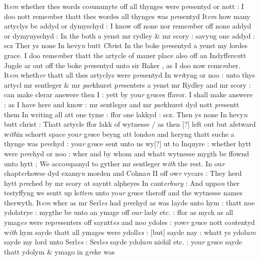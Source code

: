 \documentclass[12pt, a4paper]{book}
\begin{document}
It\textit{em} whether thes words co\textit{m}munyte off all thynges were p\textit{re}sentyd or nott : I doo nott reme\textit{m}ber thatt thes wordes all thynges was p\textit{re}sentyd It\textit{em} how many artyclys be addyd or dymyschyd : I know off none nor reme\textit{m}ber off none addyd or dymynyschyd : In the both a yenst mr  rydley \& mr scory : savy\textit{n}g one addyd : scz Ther ys none In hevy\textit{n} butt \textit{Chr}ist In the boke p\textit{re}sentyd a yenst my lordes grace. I doo reme\textit{m}ber thatt the artycle of maner place also off an
			 Indyffere\textit{n}tt Jugde ar out off the boke p\textit{re}sentyd unto sir Baker
			, as I doo now reme\textit{m}ber.  It\textit{em} wheth\textit{er} thatt all thes artyclys were p\textit{re}sentyd In w\textit{ri}tyng or noo : unto thys artycl mr sentleger \& mr \textit{par}khurst p\textit{re}senters a yenst mr Rydley and mr scory : can make clerar answere then I : yett by you\textit{r} g\textit{ra}ces ffavor. I shall make answere : as I have here and know : mr sentleger and mr \textit{par}khurst dyd nott\textit{ pre}sentt them In writing all att one tyme : ffor one lakkyd : scz. Then ys none In hevy\textit{n} butt christ : Thatt artycle ffor lakk of wytnesse / as then [?] left out but 
			afetward w\textit{ith}in schortt space you\textit{r} g\textit{ra}ce beyng att londo\textit{n} and heryng thatt suche a thynge was p\textit{re}chyd : you\textit{r} g\textit{ra}ce sent unto us wy[?] ut to Inquyre : whether hytt were p\textit{re}chyd or noo : wher and by whom and whatt wytnesse mygth be ffownd unto hytt ; We acco\textit{m}panyd to  gyther mr sentleger w\textit{ith} the rest. In ou\textit{r} chapt\textit{er}howse dyd examy\textit{n} morden and Colma\textit{n} II off ow\textit{r} vycars : They herd hytt p\textit{re}ched by mr scory at  sayntt alpheyes In cant\textit{erbury} : And uppo\textit{n} ther testyffyng we sentt up  le\textit{tter}s unto yo\textit{ur} g\textit{ra}ce theroff and the wytnesse names therwyth.  It\textit{em} wher as mr Serl\textit{es} had p\textit{re}chyd as was layde unto hym : thatt noe ydolatrye : mygthe be unto an ymage off ou\textit{r} lady etc. : ffor as mych as all ymag\textit{es} were rep\textit{re}senters off sayntt\textit{es} and noo ydoles : yow\textit{r}  g\textit{ra}ce nott co\textit{n}tentyd w\textit{ith} hym sayde thatt all ymages were ydoll\textit{es} : [but] sayde nay : whatt ys ydolu\textit{m} sayde my lord unto Serl\textit{es} : Serl\textit{es} sayde ydolu\textit{m} niehil etc. : you\textit{r} g\textit{ra}ce sayde thatt ydolym \& ymago in g\textit{re}ke was
\end{document}
